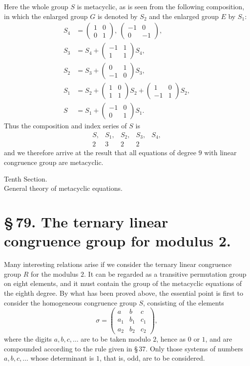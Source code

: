 \documentclass[11pt]{article}
\providecommand{\mat}[4]{\begin{pmatrix}#1&#2\\#3&#4\end{pmatrix}}
\providecommand{\mmat}[9]{\begin{pmatrix}#1&#2&#3\\#4&#5&#6\\#7&#8&#9\end{pmatrix}}
\providecommand{\mat}[4]{\begin{pmatrix}#1&#2\\#3&#4\end{pmatrix}}
\providecommand{\mmat}[9]{\begin{pmatrix}#1&#2&#3\\#4&#5&#6\\#7&#8&#9\end{pmatrix}}
\begin{document}
Here the whole group $S$ is metacyclic, as is seen from the following composition, in which the enlarged group $G$ is denoted by $S_2$ and the enlarged group $E$ by $S_1$:
\begin{align*}
 S_4&=\mat{1}{0}{0}{1},\ \mat{-1}{0}{0}{-1},\\
 S_3&=S_4+\mat{-1}{1}{1}{1}S_4,\\
 S_2&=S_3+\mat{0}{1}{-1}{0}S_3,\\
 S_1&=S_2+\mat{1}{0}{1}{1}S_2+\mat{1}{0}{-1}{1}S_2,\\
 S&=S_1+\mat{-1}{0}{0}{1}S_1.
\end{align*}
Thus the composition and index series of $S$ is
\[
 \begin{array}{ccccc}
 S,&S_1,&S_2,&S_3,&S_4,\\
 2&3&2&2&
 \end{array}
\]
and we therefore arrive at the result that all equations of degree $9$ with linear congruence group are metacyclic.




\begin{center}
{\large Tenth Section.}\\[0.4em]
{\large General theory of metacyclic equations.}
\end{center}

\section*{\S\,79. The ternary linear congruence group for modulus 2.}

Many interesting relations arise if we consider the ternary linear congruence group $R$ for the modulus $2$. It can be regarded as a transitive permutation group on eight elements, and it must contain the group of the metacyclic equations of the eighth degree. By what has been proved above, the essential point is first to consider the homogeneous congruence group $S$, consisting of the elements
\begin{equation}
 \sigma=\mmat{a}{b}{c}{a_1}{b_1}{c_1}{a_2}{b_2}{c_2},
 \tag{1}
\end{equation}
where the digits $a,b,c,\ldots$ are to be taken modulo $2$, hence as $0$ or $1$, and are compounded according to the rule given in \S\,37. Only those systems of numbers $a,b,c,\ldots$ whose determinant is $1$, that is, odd, are to be considered.
\end{document}

